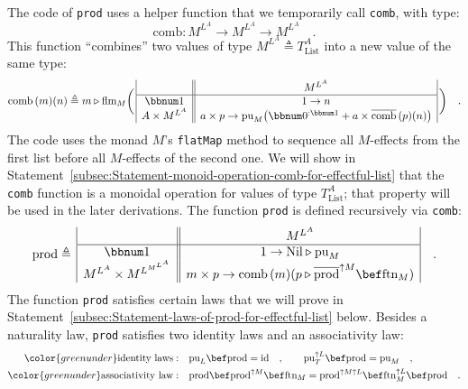 The code of \lstinline!prod! uses a helper function that we temporarily
call \lstinline!comb!, with type:
\[
\text{comb}:M^{L^{A}}\rightarrow M^{L^{A}}\rightarrow M^{L^{A}}\quad.
\]
This function \textsf{``}combines\textsf{''} two values of type $M^{L^{A}}\triangleq T_{\text{List}}^{A}$
into a new value of the same type:
\begin{equation}
\text{comb}\,(m)(n)\triangleq m\triangleright\text{flm}_{M}\bigg(\,\begin{array}{|c||c|}
 & M^{L^{A}}\\
\hline \bbnum 1 & 1\rightarrow n\\
A\times M^{L^{A}} & a\times p\rightarrow\text{pu}_{M}\big(\bbnum 0^{:\bbnum 1}+a\times\overline{\text{comb}}\,(p)(n)\big)
\end{array}\,\bigg)\quad.\label{eq:definition-of-comb-for-effectful-list}
\end{equation}
The code uses the monad $M$\textsf{'}s \lstinline!flatMap! method to sequence
all $M$-effects from the first list before all $M$-effects of the
second one. We will show in Statement~\ref{subsec:Statement-monoid-operation-comb-for-effectful-list}
that the \lstinline!comb! function is a monoidal operation for values
of type $T_{\text{List}}^{A}$; that property will be used in the
later derivations. The function \lstinline!prod! is defined recursively
via \lstinline!comb!:
\begin{equation}
\text{prod}\triangleq\,\begin{array}{|c||c|}
 & M^{L^{A}}\\
\hline \bbnum 1 & 1\rightarrow\text{Nil}\triangleright\text{pu}_{M}\\
M^{L^{A}}\times M^{L^{M^{L^{A}}}} & m\times p\rightarrow\text{comb}\,(m)(p\triangleright\overline{\text{prod}}^{\uparrow M}\bef\text{ftn}_{M})
\end{array}\quad.\label{eq:definition-of-prod-for-list-monad-transformer}
\end{equation}
The function \lstinline!prod! satisfies certain laws that we will
prove in Statement~\ref{subsec:Statement-laws-of-prod-for-effectful-list}
below. Besides a naturality law, \lstinline!prod! satisfies two identity
laws
and an associativity
law:
\begin{align}
{\color{greenunder}\text{identity laws}:}\quad & \text{pu}_{L}\bef\text{prod}=\text{id}\quad,\quad\quad\text{pu}_{T}^{\uparrow L}\bef\text{prod}=\text{pu}_{M}\quad,\label{eq:identity-laws-of-prod-for-effectful-list}\\
{\color{greenunder}\text{associativity law}:}\quad & \text{prod}\bef\text{prod}^{\uparrow M}\bef\text{ftn}_{M}=\text{prod}^{\uparrow M\uparrow L}\bef\text{ftn}_{M}^{\uparrow L}\bef\text{prod}\quad.\label{eq:associativity-law-of-prod-for-effectful-list}
\end{align}
